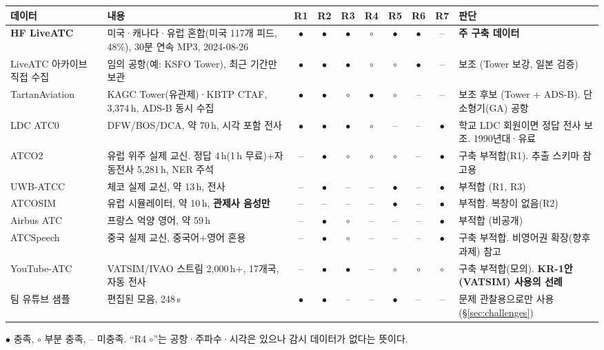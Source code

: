 \documentclass[10pt,a4paper]{article}
\begin{document}
\begin{center}\footnotesize
\setlength{\tabcolsep}{3pt}
\begin{tabularx}{\textwidth}{@{}>{\raggedright\arraybackslash}p{2.6cm}>{\raggedright\arraybackslash}p{3.4cm}ccccccc>{\raggedright\arraybackslash}X@{}}
\toprule
데이터 & 내용 & R1 & R2 & R3 & R4 & R5 & R6 & R7 & 판단\\\midrule
\textbf{HF LiveATC} \cite{hfliveatc} & 미국·캐나다·유럽 혼합(미국 117개 피드, 48\%), 30분 연속 MP3, 2024-08-26 & $\bullet$ & $\bullet$ & $\bullet$ & $\circ$ & $\bullet$ & $\bullet$ & -- & \textbf{주 구축 데이터}\\
LiveATC 아카이브 직접 수집 & 임의 공항(예: KSFO Tower), 최근 기간만 보관 & $\bullet$ & $\bullet$ & $\bullet$ & $\circ$ & $\circ$ & $\bullet$ & -- & 보조 (Tower 보강, 일본 검증)\\
TartanAviation \cite{tartan2025} & KAGC Tower(유관제)·KBTP CTAF, 3{,}374\,h, ADS-B 동시 수집 & $\bullet$ & $\bullet$ & $\circ$ & $\bullet$ & $\circ$ & -- & -- & 보조 후보 (Tower + ADS-B). 단 소형기(GA) 공항\\
LDC ATC0 \cite{atc0} & DFW/BOS/DCA, 약 70\,h, 시각 포함 전사 & $\bullet$ & $\bullet$ & $\bullet$ & $\circ$ & -- & -- & $\bullet$ & 학교 LDC 회원이면 정답 전사 보조. 1990년대·유료\\
ATCO2 \cite{atco2} & 유럽 위주 실제 교신. 정답 4\,h(1\,h 무료)+자동전사 5{,}281\,h, NER 주석 & -- & $\bullet$ & $\circ$ & $\circ$ & $\circ$ & -- & $\bullet$ & 구축 부적합(R1). 추출 스키마 참고용\\
UWB-ATCC \cite{uwbatcc} & 체코 실제 교신, 약 13\,h, 전사 & -- & $\bullet$ & -- & -- & $\bullet$ & -- & $\bullet$ & 부적합 (R1, R3)\\
ATCOSIM \cite{atcosim} & 유럽 시뮬레이터, 약 10\,h, \textbf{관제사 음성만} & -- & -- & -- & -- & $\bullet$ & -- & $\bullet$ & 부적합. 복창이 없음(R2)\\
Airbus ATC \cite{airbusatc} & 프랑스 억양 영어, 약 59\,h & -- & $\bullet$ & $\circ$ & -- & -- & -- & $\bullet$ & 부적합 (비공개)\\
ATCSpeech \cite{atcspeech} & 중국 실제 교신, 중국어+영어 혼용 & -- & $\bullet$ & $\circ$ & -- & -- & -- & $\bullet$ & 구축 부적합. 비영어권 확장(향후 과제) 참고\\
YouTube-ATC \cite{youtubeatc} & VATSIM/IVAO 스트림 2{,}000\,h+, 17개국, 자동 전사 & -- & $\bullet$ & $\bullet$ & -- & $\circ$ & $\circ$ & $\circ$ & 구축 부적합(모의). \textbf{KR-1안(VATSIM) 사용의 선례}\\
팀 유튜브 샘플 & 편집된 모음, 248\,s & $\bullet$ & $\bullet$ & -- & -- & $\bullet$ & -- & -- & 문제 관찰용으로만 사용 (\S\ref{sec:challenges})\\
\bottomrule
\end{tabularx}
\end{center}
{\footnotesize $\bullet$ 충족, $\circ$ 부분 충족, -- 미충족. ``R4 $\circ$''는 공항·주파수·시각은 있으나 감시 데이터가 없다는 뜻이다.}
\end{document}
